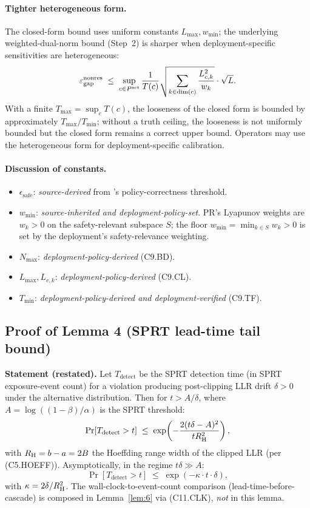 \paragraph{Tighter heterogeneous form.}
The closed-form bound uses uniform constants $L_{\max}, w_{\min}$;
the underlying weighted-dual-norm bound (Step~2) is sharper when
deployment-specific sensitivities are heterogeneous:
\[
  \varepsilon_{\mathrm{gap}}^{\mathrm{nonres}} \;\leq\;
  \sup_{c \in P^{\mathrm{act}}}
  \frac{1}{T(c)}
  \sqrt{\sum_{k \in \mathrm{dim}(c)} \frac{L_{c,k}^2}{w_k}}
  \cdot \sqrt{L}.
\]
With a finite $T_{\max} = \sup_{c} T(c)$, the looseness of the
closed form is bounded by approximately $T_{\max}/T_{\min}$;
without a truth ceiling, the looseness is not uniformly bounded
but the closed form remains a correct upper bound.  Operators may
use the heterogeneous form for deployment-specific calibration.

\paragraph{Discussion of constants.}
\begin{itemize}
\item $\epsilon_{\mathrm{safe}}$:
  \emph{source-derived} from
  \citep[Phase~Redundancy]{lasser2026phase}'s policy-correctness
  threshold.
\item $w_{\min}$: \emph{source-inherited and deployment-policy-set}.
  PR's Lyapunov weights are $w_k > 0$ on the safety-relevant
  subspace $S$; the floor $w_{\min} = \min_{k \in S} w_k > 0$ is
  set by the deployment's safety-relevance weighting.
\item $N_{\max}$: \emph{deployment-policy-derived} (C9.BD).
\item $L_{\max}, L_{c,k}$: \emph{deployment-policy-derived} (C9.CL).
\item $T_{\min}$: \emph{deployment-policy-derived and
  deployment-verified} (C9.TF).
\end{itemize}

\subsection{Proof of Lemma 4 (SPRT lead-time tail bound)}
\label{app:proof_lem4}

\textbf{Statement (restated).}  Let $T_{\mathrm{detect}}$ be the
SPRT detection time (in SPRT exposure-event count) for a violation
producing post-clipping LLR drift $\delta > 0$ under the
alternative distribution.  Then for $t > A/\delta$, where $A =
\log((1-\beta)/\alpha)$ is the SPRT threshold:
\[
  \Pr[T_{\mathrm{detect}} > t]
  \;\leq\; \exp\!\left(-\frac{2(t\delta - A)^2}{t R_{\mathrm{H}}^2}\right),
\]
with $R_{\mathrm{H}} = b - a = 2B$ the Hoeffding range width of the
clipped LLR (per (C5.HOEFF)).  Asymptotically, in the regime
$t\delta \gg A$:
\[
  \Pr[T_{\mathrm{detect}} > t]
  \;\leq\; \exp(-\kappa \cdot t \cdot \delta),
\]
with $\kappa = 2\delta/R_{\mathrm{H}}^2$.  The wall-clock-to-event-count
comparison (lead-time-before-cascade) is composed in
Lemma~\ref{lem:6} via (C11.CLK), \emph{not} in this lemma.

